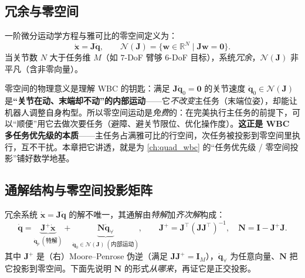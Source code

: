 \subsection{冗余与零空间}
\label{subsec:qk-redundancy}

一阶微分运动学方程与雅可比的零空间定义为\cite{yu2021quadruped}：
\begin{equation}
  \dot{\boldsymbol{x}}=\mathbf{J}\dot{\boldsymbol{q}},
  \qquad
  \mathcal{N}(\mathbf{J})=\{\boldsymbol{w}\in\mathbb{R}^N\mid \mathbf{J}\boldsymbol{w}=\mathbf{0}\}.
  \label{eq:qk-null-def}
\end{equation}
当关节数 $N$ 大于任务维 $M$（如 $7$-DoF 臂够 $6$-DoF 目标），系统\emph{冗余}，$\mathcal{N}(\mathbf{J})$ 非平凡（含非零向量）。

\begin{insight}[K7：零空间 $=$ 冗余的“免费内部运动”（WBC 多任务本质）]\label{ins:qk-nullspace-free}
零空间的物理意义是理解 WBC 的钥匙：满足 $\mathbf{J}\dot{\boldsymbol{q}}_0=\mathbf{0}$ 的关节速度 $\dot{\boldsymbol{q}}_0\in\mathcal{N}(\mathbf{J})$ 是\textbf{“关节在动、末端却不动”的内部运动}——它\emph{不改变}主任务（末端位姿），却能让机器人调整自身构型。所以零空间运动是\emph{免费}的：在完美执行主任务的前提下，可以“顺便”用它去做次要任务（避障、避关节限位、优化操作度）。\textbf{这正是 WBC 多任务优先级的本质}——主任务占满雅可比的行空间，次任务被投影到零空间里执行，互不干扰。本章把它讲透，就是为 \cref{ch:quad_wbc} 的“任务优先级 / 零空间投影”铺好数学地基。
\end{insight}

\subsection{通解结构与零空间投影矩阵}
\label{subsec:qk-general-solution}

冗余系统 $\dot{\boldsymbol{x}}=\mathbf{J}\dot{\boldsymbol{q}}$ 的解不唯一，其通解由\emph{特解}加\emph{齐次解}构成\cite{yu2021quadruped}：
\begin{equation}
  \dot{\boldsymbol{q}}=\underbrace{\mathbf{J}^{+}\dot{\boldsymbol{x}}}_{\dot{\boldsymbol{q}}_p\ (\text{特解})}+\underbrace{\mathbf{N}\dot{\boldsymbol{q}}_{\forall}}_{\dot{\boldsymbol{q}}_0\in\mathcal{N}(\mathbf{J})\ (\text{内部运动})},
  \qquad
  \mathbf{J}^{+}=\mathbf{J}^\top(\mathbf{J}\mathbf{J}^\top)^{-1},
  \quad
  \mathbf{N}=\mathbf{I}-\mathbf{J}^{+}\mathbf{J}.
  \label{eq:qk-general-solution}
\end{equation}
其中 $\mathbf{J}^{+}$ 是（右）Moore--Penrose 伪逆（满足 $\mathbf{J}\mathbf{J}^{+}=\mathbf{I}_M$），$\dot{\boldsymbol{q}}_{\forall}$ 为任意向量、$\mathbf{N}$ 把它投影到零空间。下面先说明 $\mathbf{N}$ 的形式\emph{从哪来}，再证它是正交投影。

